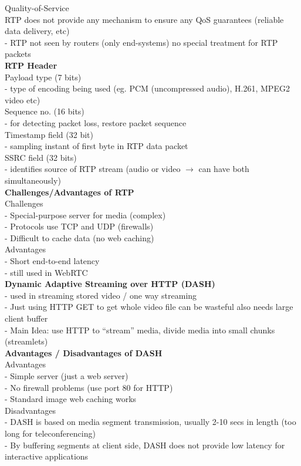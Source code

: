 \documentclass[10pt, a4paper]{article}
\newcommand{\red}[1]{{\color{red}#1}}
\newcommand{\green}[1]{{\color{ForestGreen}#1}}
\begin{document}
\begin{multicols*}{3}
		Quality-of-Service\\
		RTP does \red{not} provide any mechanism to ensure any QoS guarantees (reliable data delivery, etc)\\
		- RTP \red{not} seen by routers (only end-systems) no special treatment for RTP packets\\

		\textbf{RTP Header}\\
		Payload type (7 bits)\\
		- type of encoding being used (eg. PCM (uncompressed audio), H.261, MPEG2 video etc)\\

		Sequence no. (16 bits)\\
		- for detecting packet loss, restore packet sequence\\

		Timestamp field (32 bit)\\
		- sampling instant of first byte in RTP data packet\\

		SSRC field (32 bits)\\
		- identifies source of RTP stream (audio or video $\rightarrow$ can have both simultaneously)\\

		\textbf{Challenges/Advantages of RTP}\\
		\red{Challenges}\\
		- Special-purpose server for media (complex)\\
		- Protocols use TCP and UDP (firewalls)\\
		- Difficult to cache data (no web caching)\\

		\green{Advantages}\\
		- Short end-to-end latency\\
		- \red{still used in WebRTC}\\

		\textbf{Dynamic Adaptive Streaming over HTTP (DASH)}\\
		- used in streaming stored video / one way streaming\\
		- Just using HTTP GET to get whole video file can be \red{wasteful} also needs large client buffer\\
		- Main Idea: use HTTP to ``stream'' media, divide media into small chunks (streamlets)\\

		\textbf{Advantages / Disadvantages of DASH}\\
		\green{Advantages}\\
		- Simple server (just a web server)\\
		- No firewall problems (use port 80 for HTTP)\\
		- Standard image web caching works\\
		\red{Disadvantages}\\
		- DASH is based on media segment transmission, usually 2-10 secs in length (too long for teleconferencing)\\
		- By buffering segments at client side, DASH does \red{not} provide low latency for interactive applications\\


\end{multicols*}
\end{document}
